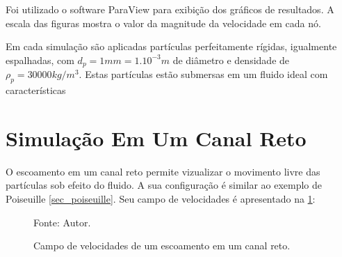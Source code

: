 Foi utilizado o software ParaView\cite{paraview} para exibição dos gráficos de resultados.
A escala das figuras mostra o valor da magnitude da velocidade em cada nó.

Em cada simulação são aplicadas partículas perfeitamente rígidas, igualmente espalhadas, com $d_p=1mm=1.10^{-3}m$ de diâmetro e densidade de $\rho_p=30000kg/m^3$.
Estas partículas estão submersas em um fluido ideal com características 

\section{\textbf{Simulação Em Um Canal Reto}}
\label{sec_channel_reto}
O escoamento em um canal reto permite vizualizar o movimento livre das partículas sob efeito do fluido.
A sua configuração é similar ao exemplo de Poiseuille \ref{sec_poiseuille}.
Seu campo de velocidades é apresentado na \ref{channel_result}:
\begin{figure}[H]
    \centering
     {\raggedleft \scriptsize Fonte: Autor.}
    \caption{Campo de velocidades de um escoamento em um canal reto.}
    \label{channel_result}
\end{figure}


